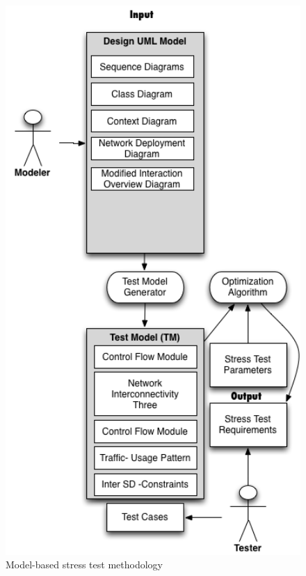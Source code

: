 \documentclass[espaco=umemeio,chapter=TITLE,twoside,openright]{abnt}
\begin{document}
\begin{figure}[!ht]
\begin{minipage}{.5\textwidth}
\centering
\includegraphics[width=1\textwidth]{./images/modelmethodology.png}
\caption{Model-based stress test methodology}
\label{fig:modelbased}
\end{minipage}
\begin{minipage}{.5\textwidth}
\centering

\end{minipage}
\end{figure}
\end{document}
